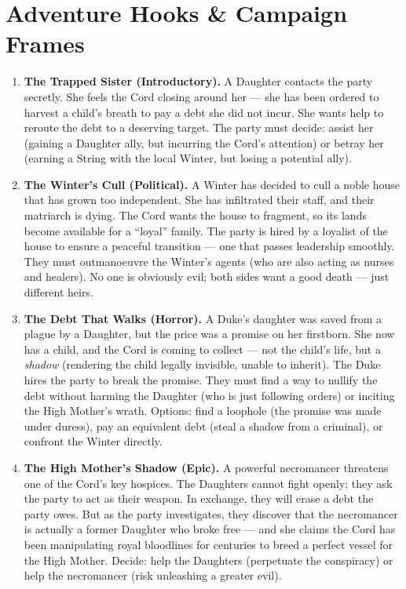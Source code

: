 \documentclass[10pt,twoside]{book}
\begin{document}
\chapter{Adventure Hooks \& Campaign Frames}

\begin{enumerate}
\item \textbf{The Trapped Sister (Introductory).} A Daughter contacts the party secretly. She feels the Cord closing around her --- she has been ordered to harvest a child's breath to pay a debt she did not incur. She wants help to reroute the debt to a deserving target. The party must decide: assist her (gaining a Daughter ally, but incurring the Cord's attention) or betray her (earning a String with the local Winter, but losing a potential ally).

\item \textbf{The Winter's Cull (Political).} A Winter has decided to cull a noble house that has grown too independent. She has infiltrated their staff, and their matriarch is dying. The Cord wants the house to fragment, so its lands become available for a ``loyal'' family. The party is hired by a loyalist of the house to ensure a peaceful transition --- one that passes leadership smoothly. They must outmanoeuvre the Winter's agents (who are also acting as nurses and healers). No one is obviously evil; both sides want a good death --- just different heirs.

\item \textbf{The Debt That Walks (Horror).} A Duke's daughter was saved from a plague by a Daughter, but the price was a promise on her firstborn. She now has a child, and the Cord is coming to collect --- not the child's life, but a \textit{shadow} (rendering the child legally invisible, unable to inherit). The Duke hires the party to break the promise. They must find a way to nullify the debt without harming the Daughter (who is just following orders) or inciting the High Mother's wrath. Options: find a loophole (the promise was made under duress), pay an equivalent debt (steal a shadow from a criminal), or confront the Winter directly.

\item \textbf{The High Mother's Shadow (Epic).} A powerful necromancer threatens one of the Cord's key hospices. The Daughters cannot fight openly; they ask the party to act as their weapon. In exchange, they will erase a debt the party owes. But as the party investigates, they discover that the necromancer is actually a former Daughter who broke free --- and she claims the Cord has been manipulating royal bloodlines for centuries to breed a perfect vessel for the High Mother. Decide: help the Daughters (perpetuate the conspiracy) or help the necromancer (risk unleashing a greater evil).


\end{enumerate}
\end{document}
